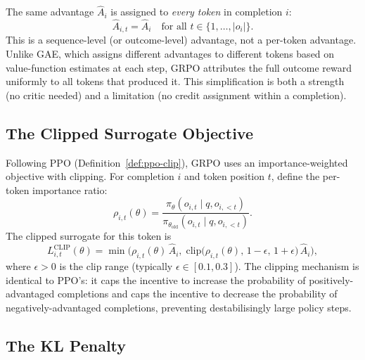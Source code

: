 \begin{remark}
The same advantage $\hat{A}_i$ is assigned to \emph{every token} in completion $i$:
\[
\hat{A}_{i,t} = \hat{A}_i \quad \text{for all } t \in \{1, \ldots, |o_i|\}.
\]
This is a sequence-level (or outcome-level) advantage, not a per-token advantage.  Unlike GAE, which assigns different advantages to different tokens based on value-function estimates at each step, GRPO attributes the full outcome reward uniformly to all tokens that produced it.  This simplification is both a strength (no critic needed) and a limitation (no credit assignment within a completion).
\end{remark}

\subsection{The Clipped Surrogate Objective}

Following PPO (Definition~\ref{def:ppo-clip}), GRPO uses an importance-weighted objective with clipping.  For completion $i$ and token position $t$, define the per-token importance ratio:
\begin{equation}
\label{eq:grpo-ratio}
\rho_{i,t}(\theta) = \frac{\pi_\theta(o_{i,t} \mid q, o_{i,<t})}{\pi_{\theta_\mathrm{old}}(o_{i,t} \mid q, o_{i,<t})}.
\end{equation}
The clipped surrogate for this token is
\begin{equation}
\label{eq:grpo-clip-token}
L_{i,t}^{\mathrm{CLIP}}(\theta) = \min\!\Big(\rho_{i,t}(\theta)\,\hat{A}_i,\; \mathrm{clip}\!\big(\rho_{i,t}(\theta),\, 1-\epsilon,\, 1+\epsilon\big)\,\hat{A}_i\Big),
\end{equation}
where $\epsilon > 0$ is the clip range (typically $\epsilon \in [0.1, 0.3]$).  The clipping mechanism is identical to PPO's: it caps the incentive to increase the probability of positively-advantaged completions and caps the incentive to decrease the probability of negatively-advantaged completions, preventing destabilisingly large policy steps.

\subsection{The KL Penalty}

